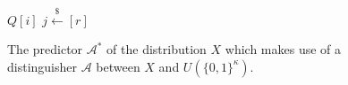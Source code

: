 \begin{figure}[t]
\begin{algorithm}[H]
    \caption{\label{alg.predictability-adversary}
    The predictor $\mathcal{A}^*$
    of the distribution $X$
    which makes use of a distinguisher $\mathcal{A}$ between
    $X$ and $U(\{0,1\}^\kappa)$.}
    \begin{algorithmic}[1]
            \State\Return$Q[i]$
        \EndFunction
                \State$j \stackrel{\$}{\gets} [r]$
            \Else
            \EndIf

                \State{}
            \Else
                \State{}
            \EndIf
        \EndFunction
    \end{algorithmic}
\end{algorithm}
\end{figure}
